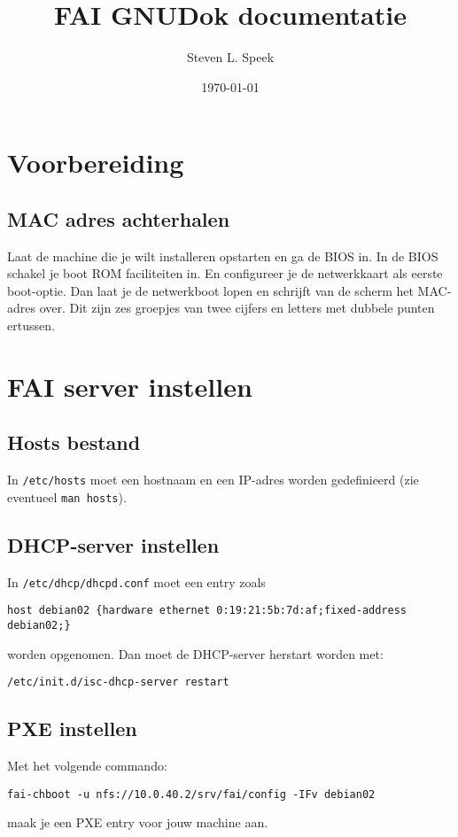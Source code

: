 \documentclass[12pt,a4paper]{article}
\begin{document}
\graphicspath{ {./images/} }
\lstset{language=bash}      
\author{Steven L. Speek}
\title{FAI GNUDok documentatie}
\date{\today}
\maketitle
{}

\section{Voorbereiding}
\subsection{MAC adres achterhalen}
Laat de machine die je wilt installeren opstarten en ga de BIOS in. In de BIOS schakel je boot ROM faciliteiten in. En configureer je de netwerkkaart als eerste boot-optie. Dan laat je de netwerkboot lopen en schrijft van de scherm het MAC-adres over. Dit zijn zes groepjes van twee cijfers en letters met dubbele punten ertussen. 

\section{FAI server instellen}
\subsection{Hosts bestand}
In \texttt{/etc/hosts} moet een hostnaam en een IP-adres worden gedefinieerd (zie eventueel \texttt{man hosts}).
\subsection{DHCP-server instellen}
In \texttt{/etc/dhcp/dhcpd.conf} moet een entry zoals 

\begin{lstlisting}
host debian02 {hardware ethernet 0:19:21:5b:7d:af;fixed-address debian02;}
\end{lstlisting}
worden opgenomen. Dan moet de DHCP-server herstart worden met:

\begin{lstlisting}
/etc/init.d/isc-dhcp-server restart
\end{lstlisting}


\subsection{PXE instellen}
Met het volgende commando:
\begin{lstlisting}
fai-chboot -u nfs://10.0.40.2/srv/fai/config -IFv debian02
\end{lstlisting}
maak je een PXE entry voor jouw machine aan.
\end{document}

